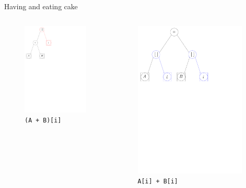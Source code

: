 \documentclass[xcolor=dvipsnames]{beamer}
\begin{document}
\begin{frame}[fragile]{Having and eating cake}
  \begin{columns}[T] %
    \begin{column}{0.35\textwidth}
      \begin{figure}[H]
        \centering
        \includegraphics[width=4.3cm]{fig_expr_c}
        \caption*{\texttt{(A + B)[i]}}
      \end{figure}
    \end{column}%
    \hfill%
    \begin{column}{0.55\textwidth}
      \begin{figure}[H]
        \centering
        \includegraphics[width=7cm]{fig_expr_opt_c}
        \caption*{\texttt{A[i] + B[i]}}
      \end{figure}
    \end{column}%
  \end{columns}
\end{frame}
\end{document}
